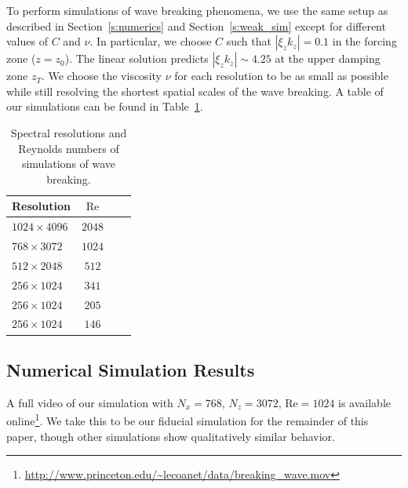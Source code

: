 \documentclass[
        fleqn,
        usenatbib,
    ]{mnras}
\newcommand*{\abs}[1]{\left|#1\right|}
\begin{document}

To perform simulations of wave breaking phenomena, we use the same setup as
described in Section~\ref{s:numerics} and Section~\ref{s:weak_sim} except for
different values of $C$ and $\nu$. In particular, we choose $C$ such that
$\abs{\xi_z k_z} = 0.1$ in the forcing zone ($z = z_0$). The linear solution
predicts $\abs{\xi_z k_z} \sim 4.25$ at the upper damping zone $z_T$.
\textcolor{Corr}{We choose the viscosity $\nu$ for each resolution to be as
small as possible while still resolving the shortest spatial scales of the wave
breaking.} A table of our simulations can be found in Table~\ref{tab:params}.
\begin{table}
    \centering
    \begin{tabular}{l c c c}
        Resolution & $\mathrm{Re}$\\\bottomrule
        $1024 \times 4096$ & $2048$\\
        $768 \times 3072$ & $1024$\\
        $512 \times 2048$ & $512$\\
        $256 \times 1024$ & $341$\\
        $256 \times 1024$ & $205$\\
        $256 \times 1024$ & $146$\\
    \end{tabular}
    \caption{Spectral resolutions and Reynolds numbers of simulations of wave
    breaking.}\label{tab:params}
\end{table}

\subsection{Numerical Simulation Results}\label{ss:nl_ns}

A full video of our simulation with $N_x = 768$, $N_z = 3072$, $\mathrm{Re} =
1024$ is available
online\footnote{\url{http://www.princeton.edu/\~lecoanet/data/breaking\_wave.mov}}. We
take this to be our fiducial simulation for the remainder of this paper, though
other simulations show qualitatively similar behavior.
\end{document}
